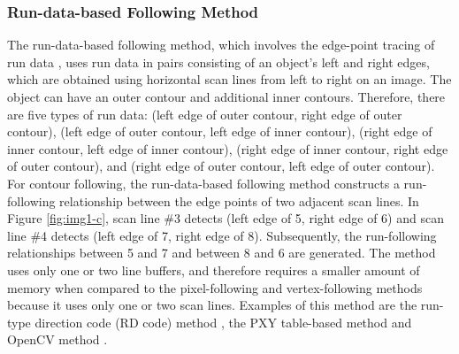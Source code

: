 \subsubsection{Run-data-based Following Method}

The run-data-based following method, which involves the edge-point tracing of run data \cite{Miyatake1997Contour,Shoji1999Contour}, uses run data in pairs consisting of an object's left and right edges, which are obtained using horizontal scan lines from left to right on an image. The object can have an outer contour and additional inner contours. Therefore, there are five types of run data: (left edge of outer contour, right edge of outer contour), (left edge of outer contour, left edge of inner contour), (right edge of inner contour, left edge of inner contour), (right edge of inner contour, right edge of outer contour), and (right edge of outer contour, left edge of outer contour). For contour following, the run-data-based following method constructs a run-following relationship between the edge points of two adjacent scan lines. In Figure \ref{fig:img1-c}, scan line \#3 detects (left edge of 5, right edge of 6) and scan line \#4 detects (left edge of 7, right edge of 8). Subsequently, the run-following relationships between 5 and 7 and between 8 and 6 are generated. The method uses only one or two line buffers, and therefore requires a smaller amount of memory when compared to the pixel-following and vertex-following methods because it uses only one or two scan lines. Examples of this method are the run-type direction code (RD code) method \cite{Miyatake1997Contour}, the PXY table-based method \cite{Shoji1999Contour} and OpenCV method \cite{Suzuki1985Topological}. 

